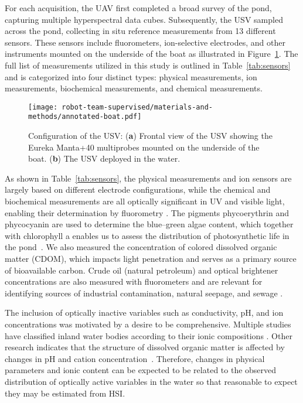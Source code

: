 For each acquisition, the UAV first completed a broad survey of the pond, capturing
multiple hyperspectral data cubes. Subsequently, the USV sampled across the
pond, collecting in situ reference measurements from 13 different sensors.
These sensors include fluorometers, ion-selective electrodes, and
other instruments mounted on the underside of the boat as illustrated in
Figure~\ref{fig:boat-components}. The full list of measurements utilized in this
study is outlined in Table~\ref{tab:sensors} and is categorized into four
distinct types: physical measurements, ion measurements, biochemical
measurements, and chemical measurements. 

\begin{figure}[H]
  \centering
  \texttt{[image: robot-team-supervised/materials-and-methods/annotated-boat.pdf]}
  \caption{Configuration of the USV: (\textbf{a}) Frontal view of the USV
    showing the Eureka Manta+40 multiprobes mounted on the underside of the
    boat. (\textbf{b}) The USV deployed in the water.}
  \label{fig:boat-components}
\end{figure}

As shown in Table~\ref{tab:sensors}, the physical measurements and ion sensors
are largely based on different electrode configurations, while the chemical and
biochemical measurements are all optically significant in UV and visible light,
enabling their determination by fluorometry
\cite{de2007ion,trees2002fluorometric,tillman2017evaluation}. The pigments
phycoerythrin and phycocyanin are used to determine the blue--green algae
content, which together with chlorophyll a enables us to assess the distribution
of photosynthetic life in the pond~\cite{Brient2008APP, boyer2009phytoplankton}.
We also measured the concentration of colored dissolved organic
matter (CDOM), which impacts light penetration and serves as a primary source of
bioavailable carbon. Crude oil (natural petroleum) and optical brightener
concentrations are also measured with fluorometers and are relevant for
identifying sources of industrial contamination, natural seepage, and sewage
\cite{brown2003review,cao2009evaluation}.

The inclusion of optically inactive variables such as conductivity, pH, and ion
concentrations was motivated by a desire to be comprehensive. Multiple studies
have classified inland water bodies according to their ionic compositions
\cite{piper1944graphic, dordoni2023preliminary}. Other research indicates that
the structure of dissolved organic matter is affected by changes in pH and
cation concentration~\cite{pace2012ph}. Therefore, changes in physical
parameters and ionic content can be expected to be related to the observed
distribution of optically active variables in the water so that
reasonable to expect they may be estimated from HSI.

